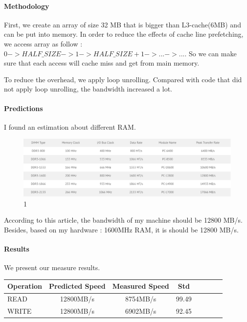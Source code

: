 \paragraph{Methodology}
First, we create an array of size 32 MB that is bigger than L3-cache(6MB) and can be put into memory. In order to reduce the effects of cache line prefetching, we access array as follow : $0 -> HALF\_SIZE -> 1 -> HALF\_SIZE+1 -> ... -> ...$. So we can make sure that each access will cache miss and get from main memory.

To reduce the overhead, we apply loop unrolling. Compared with code that did not apply loop unrolling, the bandwidth increased  a lot.

\paragraph{Predictions}

I found an estimation about different RAM\cite{ramref}.

\begin{figure}[!htb]
\centering
\includegraphics[width=6in]{./pics/ram_ref.png}
\caption{1}\label{RAM bandwidth}
\end{figure}

According to this article, the bandwidth of my machine should be 12800 MB/s. Besides, based on my hardware : 1600MHz RAM, it is should be 12800 MB/s.

\paragraph{Results}
We present our measure results.

\begin{center}
\begin{tabular}{l*{6}{c}r}
Operation             & Predicted Speed & Measured Speed & Std \\
\hline
READ & 12800MB/s & 8754MB/s & 99.49 \\
WRITE & 12800MB/s & 6902MB/s & 92.45\\

\end{tabular}
\end{center}

